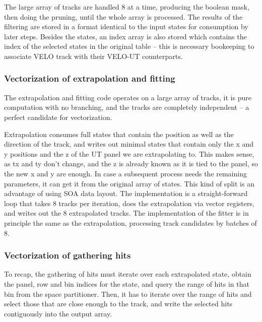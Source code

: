 \documentclass[12pt]{article}
\begin{document}
The large array of tracks are handled 8 at a time, producing the boolean mask, then doing the pruning, until the whole array is processed. The results of the filtering are stored in a format identical to the input states for consumption by later steps. Besides the states, an index array is also stored which contains the index of the selected states in the original table -- this is necessary bookeeping to associate VELO track with their VELO-UT counterparts.

\subsubsection{Vectorization of extrapolation and fitting}\label{sec_velout_vectorize_extrap_fit}

The extrapolation and fitting code operates on a large array of tracks, it is pure computation with no branching, and the tracks are completely independent -- a perfect candidate for vectorization.

Extrapolation consumes full states that contain the position as well as the direction of the track, and writes out minimal states that contain only the x and y positions and the z of the UT panel we are extrapolating to. This makes sense, as tx and ty don't change, and the z is already known as it is tied to the panel, so the new x and y are enough. In case a subsequent process needs the remaining parameters, it can get it from the original array of states. This kind of split is an advantage of using SOA data layout. The implementation is a straight-forward loop that takes 8 tracks per iteration, does the extrapolation via vector registers, and writes out the 8 extrapolated tracks. The implementation of the fitter is in principle the same as the extrapolation, processing track candidates by batches of 8.


\subsubsection{Vectorization of gathering hits}\label{sec_velout_vectorize_gathering_hits}

To recap, the gathering of hits must iterate over each extrapolated state, obtain the panel, row and bin indices for the state, and query the range of hits in that bin from the space partitioner. Then, it has to iterate over the range of hits and select those that are close enough to the track, and write the selected hits contiguously into the output array.
\end{document}

